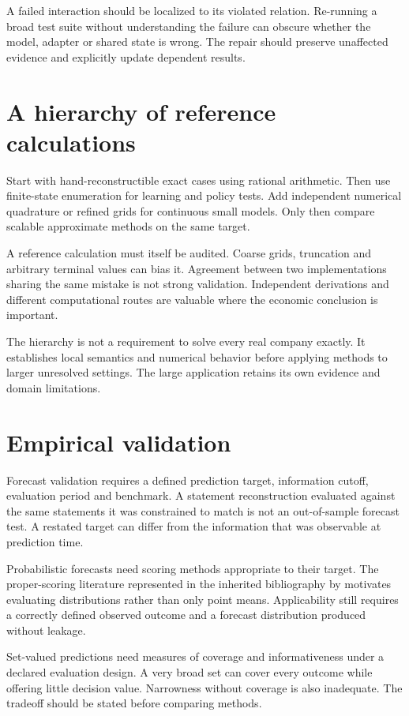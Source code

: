 A failed interaction should be localized to its violated relation. Re-running a broad test suite without understanding the failure can obscure whether the model, adapter or shared state is wrong. The repair should preserve unaffected evidence and explicitly update dependent results.

\section{A hierarchy of reference calculations}
Start with hand-reconstructible exact cases using rational arithmetic. Then use finite-state enumeration for learning and policy tests. Add independent numerical quadrature or refined grids for continuous small models. Only then compare scalable approximate methods on the same target.

A reference calculation must itself be audited. Coarse grids, truncation and arbitrary terminal values can bias it. Agreement between two implementations sharing the same mistake is not strong validation. Independent derivations and different computational routes are valuable where the economic conclusion is important.

The hierarchy is not a requirement to solve every real company exactly. It establishes local semantics and numerical behavior before applying methods to larger unresolved settings. The large application retains its own evidence and domain limitations.

\section{Empirical validation}
Forecast validation requires a defined prediction target, information cutoff, evaluation period and benchmark. A statement reconstruction evaluated against the same statements it was constrained to match is not an out-of-sample forecast test. A restated target can differ from the information that was observable at prediction time.

Probabilistic forecasts need scoring methods appropriate to their target. The proper-scoring literature represented in the inherited bibliography by \citet{gneiting2007proper} motivates evaluating distributions rather than only point means. Applicability still requires a correctly defined observed outcome and a forecast distribution produced without leakage.

Set-valued predictions need measures of coverage and informativeness under a declared evaluation design. A very broad set can cover every outcome while offering little decision value. Narrowness without coverage is also inadequate. The tradeoff should be stated before comparing methods.

